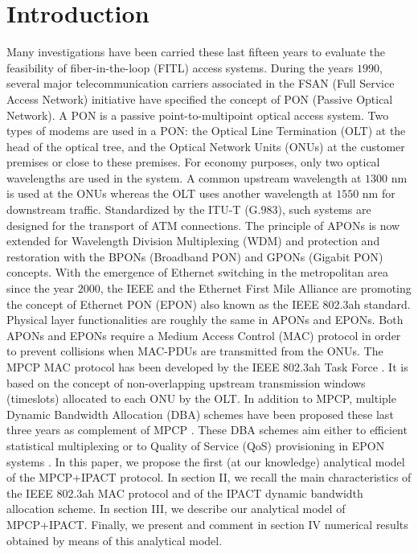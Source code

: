 \documentclass[a4paper,10pt]{IEEEtran}
\begin{document}
\section{Introduction}
Many investigations have been carried these last fifteen years to
evaluate the feasibility of fiber-in-the-loop (FITL) access systems.
During the years $1990$, several major telecommunication carriers
associated in the FSAN (Full Service Access Network) initiative have
specified the concept of PON (Passive Optical Network). A PON is a
passive point-to-multipoint optical access system. Two types of
modems are used in a PON: the Optical Line Termination (OLT) at the
head of the optical tree, and the Optical Network Units (ONUs) at
the customer premises or close to these premises. For economy
purposes, only two optical wavelengths are used in the system. A
common upstream wavelength at $1300$ nm is used at the ONUs whereas
the OLT uses another wavelength at $1550$ nm for downstream traffic.
Standardized by the ITU-T (G.$983$), such systems are designed for
the transport of ATM connections. The principle of APONs is now
extended for Wavelength Division Multiplexing (WDM) and protection
and restoration with the BPONs (Broadband PON) and GPONs (Gigabit
PON) concepts. With the emergence of Ethernet switching in the
metropolitan area since the year $2000$, the IEEE and the Ethernet
First Mile Alliance are promoting the concept of Ethernet PON (EPON)
also known as the IEEE 802.3ah standard. Physical layer
functionalities are roughly the same in APONs and EPONs. Both APONs
and EPONs require a Medium Access Control (MAC) protocol in order to
prevent collisions when MAC-PDUs are transmitted from the ONUs. The
MPCP MAC protocol has been developed by the IEEE 802.3ah Task Force
\cite{MPCP:IEEE}. It is based on the concept of non-overlapping
upstream transmission windows (timeslots) allocated to each ONU by
the OLT. In addition to MPCP, multiple Dynamic Bandwidth Allocation
(DBA) schemes have been proposed these last three years as
complement of MPCP \cite{Kramer:FQSE, Ma:2003}. These DBA schemes
aim either to efficient statistical multiplexing or to Quality of
Service (QoS) provisioning in EPON systems \cite{McGarry:2004}. In
this paper, we propose the first (at our knowledge) analytical model
of the MPCP+IPACT protocol. In section II, we recall the main
characteristics of the IEEE 802.3ah MAC protocol and of the IPACT
dynamic bandwidth allocation scheme. In section III, we describe our
analytical model of MPCP+IPACT. Finally, we present and comment in
section IV numerical results obtained by means of this analytical
model.
\end{document}
